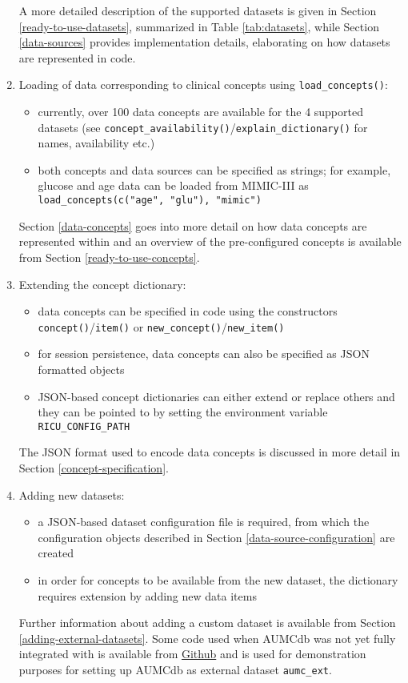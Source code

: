 \documentclass[
  notitle]{jss}
\begin{document}
\begin{enumerate}
  A more detailed description of the supported datasets is given in
  Section \ref{ready-to-use-datasets}, summarized in Table
  \ref{tab:datasets}, while Section \ref{data-sources} provides
  implementation details, elaborating on how datasets are represented in
  code.
\item
  Loading of data corresponding to clinical concepts using
  \texttt{load\_concepts()}:

  \begin{itemize}
  \item
    currently, over 100 data concepts are available for the 4 supported
    datasets (see
    \texttt{concept\_availability()}/\texttt{explain\_dictionary()} for
    names, availability etc.)
  \item
    both concepts and data sources can be specified as strings; for
    example, glucose and age data can be loaded from MIMIC-III as
    \texttt{load\_concepts(c("age",\ "glu"),\ "mimic")}
  \end{itemize}

  Section \ref{data-concepts} goes into more detail on how data concepts
  are represented within  and an overview of the
  pre-configured concepts is available from Section
  \ref{ready-to-use-concepts}.
\item
  Extending the concept dictionary:

  \begin{itemize}
  \item
    data concepts can be specified in code using the constructors
    \texttt{concept()}/\texttt{item()} or
    \texttt{new\_concept()}/\texttt{new\_item()}
  \item
    for session persistence, data concepts can also be specified as JSON
    formatted objects
  \item
    JSON-based concept dictionaries can either extend or replace others
    and they can be pointed to by setting the environment variable
    \texttt{RICU\_CONFIG\_PATH}
  \end{itemize}

  The JSON format used to encode data concepts is discussed in more
  detail in Section \ref{concept-specification}.
\item
  Adding new datasets:

  \begin{itemize}
  \item
    a JSON-based dataset configuration file is required, from which the
    configuration objects described in Section
    \ref{data-source-configuration} are created
  \item
    in order for concepts to be available from the new dataset, the
    dictionary requires extension by adding new data items
  \end{itemize}

  Further information about adding a custom dataset is available from
  Section \ref{adding-external-datasets}. Some code used when AUMCdb was
  not yet fully integrated with  is available from
  \href{https://github.com/eth-mds/aumc}{Github} and is used for
  demonstration purposes for setting up AUMCdb as external dataset
  \texttt{aumc\_ext}.
\end{enumerate}
\end{document}
